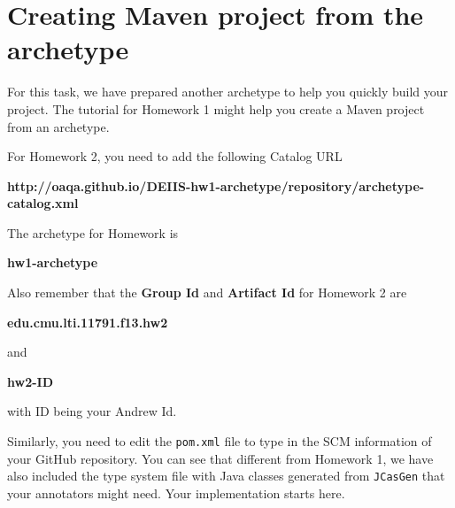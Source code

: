 
\section{Creating Maven project from the archetype}

For this task, we have prepared another archetype to help you quickly build your
project. The tutorial for Homework 1 might help you create a Maven project from
an archetype.

For Homework 2, you need to add the following Catalog URL

\begin{center}
\textbf{http://oaqa.github.io/DEIIS-hw1-archetype/repository/archetype-catalog.xml}
\end{center}

The archetype for Homework is

\begin{center}
\textbf{hw1-archetype}
\end{center}

Also remember that the \textbf{Group Id} and \textbf{Artifact Id} for Homework 2
are

\begin{center}
\textbf{edu.cmu.lti.11791.f13.hw2}
\end{center}

and

\begin{center}
\textbf{hw2-ID}
\end{center}

with ID being your Andrew Id.

Similarly, you need to edit the \texttt{pom.xml} file to type in the SCM
information of your GitHub repository. You can see that different from Homework
1, we have also included the type system file with Java classes generated from
\texttt{JCasGen} that your annotators might need. Your implementation starts
here.
